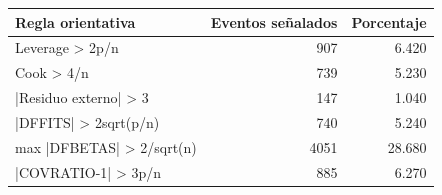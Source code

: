 \begin{tabular}{lrr}
\toprule
Regla orientativa & Eventos señalados & Porcentaje \\
\midrule
Leverage > 2p/n & 907 & 6.420 \\
Cook > 4/n & 739 & 5.230 \\
|Residuo externo| > 3 & 147 & 1.040 \\
|DFFITS| > 2sqrt(p/n) & 740 & 5.240 \\
max |DFBETAS| > 2/sqrt(n) & 4051 & 28.680 \\
|COVRATIO-1| > 3p/n & 885 & 6.270 \\
\bottomrule
\end{tabular}
